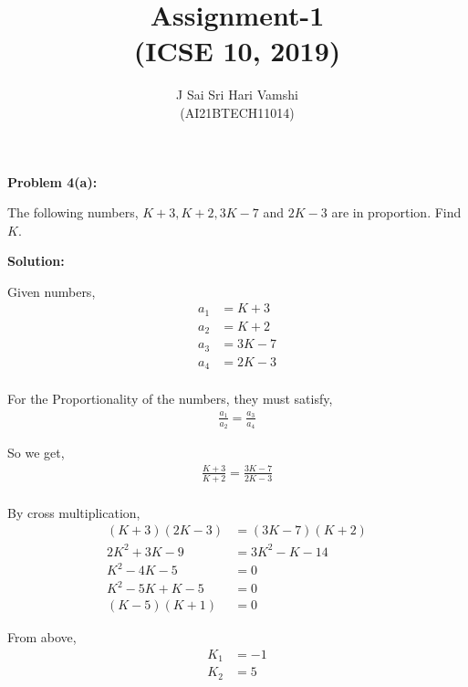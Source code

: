 \documentclass[journal,12pt,twocolumn]{article}\usepackage[margin=1.25 in]{geometry}
\title{\LARGE{\textbf{Assignment-1}\\(ICSE 10, 2019)}}
\author{\normalsize J Sai Sri Hari Vamshi\\ \footnotesize (AI21BTECH11014)}
\date{}
\begin{document}
\maketitle

\begin{center}
    \textbf{\large Problem 4(a):}
\end{center}
\begin{flushleft}
The following numbers, $K + 3, K + 2, 3K - 7$ and $2K - 3$ are in proportion. Find $K$.\\[2\baselineskip]
\end{flushleft}
\begin{center}
    \textbf{\large Solution:}
\end{center}
\begin{flushleft}
Given numbers,
\begin{align*}
a_1 & = K + 3\\
a_2 & = K + 2\\
a_3 & = 3K - 7\\
a_4 & = 2K - 3\\
\end{align*}

For the Proportionality of the numbers, they must satisfy,
\begin{align*}
	\frac{a_1}{a_2} = \frac{a_3}{a_4}
\end{align*}

So we get,
\begin{align*}
	\frac{K + 3}{K + 2} = \frac{3K - 7}{2K - 3}\\
\end{align*}

By cross multiplication,
\begin{align*}
    (K + 3)(2K - 3) & = (3K - 7)(K + 2)\\
    2K^2 + 3K - 9 & = 3K^2 - K - 14\\
    K^2 - 4K - 5 & = 0\\
    K^2 - 5K + K - 5 & = 0\\
    (K - 5)(K + 1) & = 0
\end{align*}

From above,
\begin{align*}
	K_1 & = -1\\
	K_2 & = 5
\end{align*}


\end{flushleft}
\end{document}
